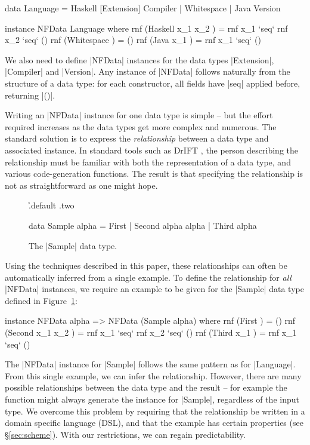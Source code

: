 \documentclass[preprint,draft]{sigplanconf}
\begin{document}
\begin{code}
data Language  =  Haskell [Extension] Compiler
               |  Whitespace
               |  Java Version

instance NFData Language where
    rnf (Haskell x_1 x_2  ) = rnf x_1 `seq` rnf x_2 `seq` ()
    rnf (Whitespace       ) = ()
    rnf (Java x_1         ) = rnf x_1 `seq` ()
\end{code}

We also need to define |NFData| instances for the data types |Extension|, |Compiler| and |Version|. Any instance of |NFData| follows naturally from the structure of a data type: for each constructor, all fields have |seq| applied before, returning |()|.

Writing an |NFData| instance for one data type is simple -- but the effort required increases as the data types get more complex and numerous. The standard solution is to express the \textit{relationship} between a data type and associated instance. In standard tools such as DrIFT \cite{drift}, the person describing the relationship must be familiar with both the representation of a data type, and various code-generation functions. The result is that specifying the relationship is not as straightforward as one might hope.

\begin{figure}
\h{.default .two}\begin{code}
data Sample alpha  =  First
                   |  Second  alpha alpha
                   |  Third   alpha
\end{code}
\caption{The |Sample| data type.}
\label{fig:sample}
\end{figure}

Using the techniques described in this paper, these relationships can often be automatically inferred from a single example. To define the relationship for \textit{all} |NFData| instances, we require an example to be given for the |Sample| data type defined in Figure~\ref{fig:sample}:

\begin{code}
instance NFData alpha => NFData (Sample alpha) where
    rnf (First           ) = ()
    rnf (Second x_1 x_2  ) = rnf x_1 `seq` rnf x_2 `seq` ()
    rnf (Third x_1       ) = rnf x_1 `seq` ()
\end{code}

The |NFData| instance for |Sample| follows the same pattern as for |Language|. From this single example, we can infer the relationship. However, there are many possible relationships between the data type and the result -- for example the function might always generate the instance for |Sample|, regardless of the input type. We overcome this problem by requiring that the relationship be written in a domain specific language (DSL), and that the example has certain properties (see \S\ref{sec:scheme}). With our restrictions, we can regain predictability.
\end{document}
